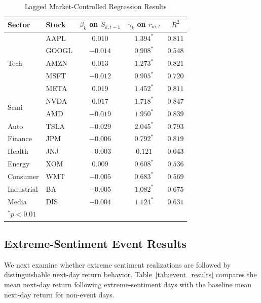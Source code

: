 \documentclass[lettersize,journal]{IEEEtran}
\begin{document}
\begin{table}[!htbp]
\centering
\caption{Lagged Market-Controlled Regression Results}
\label{tab:regression_results}
\begin{tabular}{llccc}
\toprule
\textbf{Sector} & \textbf{Stock} & \textbf{$\beta_k$ on $S_{k,t-1}$} & \textbf{$\gamma_k$ on $r_{m,t}$} & \textbf{$R^2$} \\
\midrule
\multirow{5}{*}{Tech}  & AAPL  & $0.010$ & $1.394^{*}$ & $0.811$ \\
                        & GOOGL & $-0.014$ & $0.908^{*}$ & $0.548$ \\
                        & AMZN  & $0.013$ & $1.273^{*}$ & $0.821$ \\
                        & MSFT  & $-0.012$ & $0.905^{*}$ & $0.720$ \\
                        & META  & $0.019$ & $1.452^{*}$ & $0.811$ \\
\midrule
\multirow{2}{*}{Semi}  & NVDA  & $0.017$ & $1.718^{*}$ & $0.847$ \\
                        & AMD   & $-0.019$ & $1.950^{*}$ & $0.839$ \\
\midrule
Auto   & TSLA  & $-0.029$ & $2.045^{*}$ & $0.793$ \\
\midrule
Finance & JPM  & $-0.006$ & $0.792^{*}$ & $0.819$ \\
\midrule
Health & JNJ   & $-0.003$ & $0.121$ & $0.043$ \\
\midrule
Energy & XOM   & $0.009$ & $0.608^{*}$ & $0.536$ \\
\midrule
Consumer & WMT & $-0.005$ & $0.683^{*}$ & $0.569$ \\
\midrule
Industrial & BA & $-0.005$ & $1.082^{*}$ & $0.675$ \\
\midrule
Media  & DIS   & $-0.004$ & $1.124^{*}$ & $0.631$ \\
\bottomrule
\multicolumn{5}{l}{\small $^{*}p < 0.01$}
\end{tabular}
\end{table}


\subsection{Extreme-Sentiment Event Results}
We next examine whether extreme sentiment realizations are followed by distinguishable next-day return behavior. Table~\ref{tab:event_results} compares the mean next-day return following extreme-sentiment days with the baseline mean next-day return for non-event days.
\end{document}
